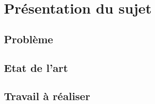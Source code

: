 \chapter{Présentation du sujet}
    \section{Problème}
    \section{Etat de l'art}
    \section{Travail à réaliser}